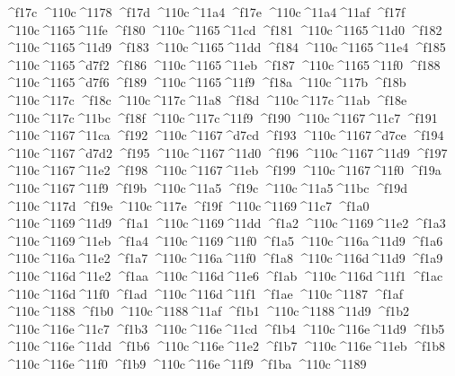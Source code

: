 \checkit ^^^^f17c ^^^^110c^^^^1178
\checkit ^^^^f17d ^^^^110c^^^^11a4
\checkit ^^^^f17e ^^^^110c^^^^11a4^^^^11af
\checkit ^^^^f17f ^^^^110c^^^^1165^^^^11fe
\checkit ^^^^f180 ^^^^110c^^^^1165^^^^11cd
\checkit ^^^^f181 ^^^^110c^^^^1165^^^^11d0
\checkit ^^^^f182 ^^^^110c^^^^1165^^^^11d9
\checkit ^^^^f183 ^^^^110c^^^^1165^^^^11dd
\checkit ^^^^f184 ^^^^110c^^^^1165^^^^11e4
\checkit ^^^^f185 ^^^^110c^^^^1165^^^^d7f2
\checkit ^^^^f186 ^^^^110c^^^^1165^^^^11eb
\checkit ^^^^f187 ^^^^110c^^^^1165^^^^11f0
\checkit ^^^^f188 ^^^^110c^^^^1165^^^^d7f6
\checkit ^^^^f189 ^^^^110c^^^^1165^^^^11f9
\checkit ^^^^f18a ^^^^110c^^^^117b
\checkit ^^^^f18b ^^^^110c^^^^117c
\checkit ^^^^f18c ^^^^110c^^^^117c^^^^11a8
\checkit ^^^^f18d ^^^^110c^^^^117c^^^^11ab
\checkit ^^^^f18e ^^^^110c^^^^117c^^^^11bc
\checkit ^^^^f18f ^^^^110c^^^^117c^^^^11f9
\checkit ^^^^f190 ^^^^110c^^^^1167^^^^11c7
\checkit ^^^^f191 ^^^^110c^^^^1167^^^^11ca
\checkit ^^^^f192 ^^^^110c^^^^1167^^^^d7cd
\checkit ^^^^f193 ^^^^110c^^^^1167^^^^d7ce
\checkit ^^^^f194 ^^^^110c^^^^1167^^^^d7d2
\checkit ^^^^f195 ^^^^110c^^^^1167^^^^11d0
\checkit ^^^^f196 ^^^^110c^^^^1167^^^^11d9
\checkit ^^^^f197 ^^^^110c^^^^1167^^^^11e2
\checkit ^^^^f198 ^^^^110c^^^^1167^^^^11eb
\checkit ^^^^f199 ^^^^110c^^^^1167^^^^11f0
\checkit ^^^^f19a ^^^^110c^^^^1167^^^^11f9
\checkit ^^^^f19b ^^^^110c^^^^11a5
\checkit ^^^^f19c ^^^^110c^^^^11a5^^^^11bc
\checkit ^^^^f19d ^^^^110c^^^^117d
\checkit ^^^^f19e ^^^^110c^^^^117e
\checkit ^^^^f19f ^^^^110c^^^^1169^^^^11c7
\checkit ^^^^f1a0 ^^^^110c^^^^1169^^^^11d9
\checkit ^^^^f1a1 ^^^^110c^^^^1169^^^^11dd
\checkit ^^^^f1a2 ^^^^110c^^^^1169^^^^11e2
\checkit ^^^^f1a3 ^^^^110c^^^^1169^^^^11eb
\checkit ^^^^f1a4 ^^^^110c^^^^1169^^^^11f0
\checkit ^^^^f1a5 ^^^^110c^^^^116a^^^^11d9
\checkit ^^^^f1a6 ^^^^110c^^^^116a^^^^11e2
\checkit ^^^^f1a7 ^^^^110c^^^^116a^^^^11f0
\checkit ^^^^f1a8 ^^^^110c^^^^116d^^^^11d9
\checkit ^^^^f1a9 ^^^^110c^^^^116d^^^^11e2
\checkit ^^^^f1aa ^^^^110c^^^^116d^^^^11e6
\checkit ^^^^f1ab ^^^^110c^^^^116d^^^^11f1
\checkit ^^^^f1ac ^^^^110c^^^^116d^^^^11f0
\checkit ^^^^f1ad ^^^^110c^^^^116d^^^^11f1
\checkit ^^^^f1ae ^^^^110c^^^^1187
\checkit ^^^^f1af ^^^^110c^^^^1188
\checkit ^^^^f1b0 ^^^^110c^^^^1188^^^^11af
\checkit ^^^^f1b1 ^^^^110c^^^^1188^^^^11d9
\checkit ^^^^f1b2 ^^^^110c^^^^116e^^^^11c7
\checkit ^^^^f1b3 ^^^^110c^^^^116e^^^^11cd
\checkit ^^^^f1b4 ^^^^110c^^^^116e^^^^11d9
\checkit ^^^^f1b5 ^^^^110c^^^^116e^^^^11dd
\checkit ^^^^f1b6 ^^^^110c^^^^116e^^^^11e2
\checkit ^^^^f1b7 ^^^^110c^^^^116e^^^^11eb
\checkit ^^^^f1b8 ^^^^110c^^^^116e^^^^11f0
\checkit ^^^^f1b9 ^^^^110c^^^^116e^^^^11f9
\checkit ^^^^f1ba ^^^^110c^^^^1189
